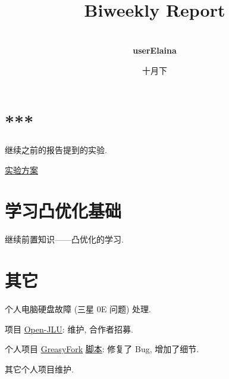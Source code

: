 \documentclass[a4paper]{article}
\title{
    \vspace*{1.0in}
     \\
    \vspace*{1in}
    \textbf{\Huge Biweekly Report}
    \vspace{0.5in}
}
\author{ \\
    \textbf{\huge userElaina} \\
    \vspace*{1in}
}
\date{\LARGE 十月下}
\begin{document}
\LARGE

\maketitle
\tableofcontents
\thispagestyle{empty}
\newpage

\section{***}

继续之前的报告提到的实验.

\href{https://www.overleaf.com/project/64fdf0c42ddf7bc3a46879ea}{实验方案}

\section{学习凸优化基础}

继续前置知识——凸优化的学习.

\section{其它}

个人电脑硬盘故障 (三星 0E 问题) 处理.

项目 \href{https://github.com/userElaina/Open-JLU}{Open-JLU}: 维护, 合作者招募.

个人项目 \href{https://greasyfork.org/zh-CN/scripts/461427-%E5%9B%BD%E9%99%85%E7%BD%91%E7%AB%99-%E4%BC%AA%E8%A3%85%E6%88%90-%E5%9B%BD%E5%86%85%E7%BD%91%E7%AB%99-%E6%B1%87%E6%80%BB}{GreasyFork} \href{https://github.com/userElaina/this-is-the-China-website}{脚本}: 修复了 Bug, 增加了细节.

其它个人项目维护.
\end{document}
